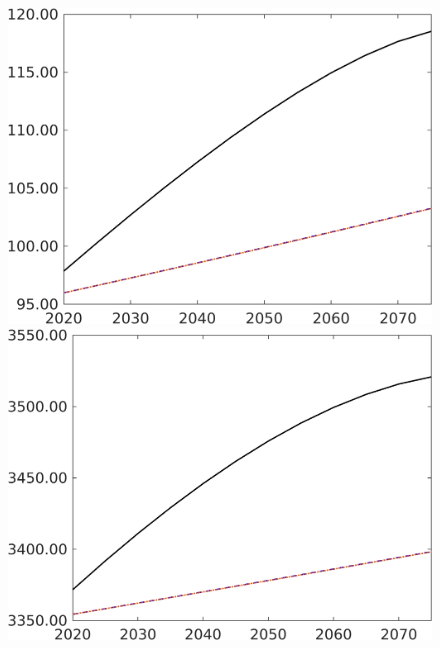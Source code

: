 \begin{figure}[h!!]
\begin{minipage}[]{0.32\textwidth}
	\includegraphics[width=1\textwidth]{../../codding_model/own_basedOnFried/optimalPol_elastS_DisuSci/figures/all_1705/Ag_CompEffOPT_NOT_NoTaus_spillover0_sep1_BN0_ineq0_red0_etaa0.79_lgd0.png}
\end{minipage}
\begin{minipage}[]{0.32\textwidth}
	\includegraphics[width=1\textwidth]{../../codding_model/own_basedOnFried/optimalPol_elastS_DisuSci/figures/all_1705/Af_CompEffOPT_NOT_NoTaus_spillover0_sep1_BN0_ineq0_red0_etaa0.79_lgd0.png}

\end{minipage}
\end{figure}
